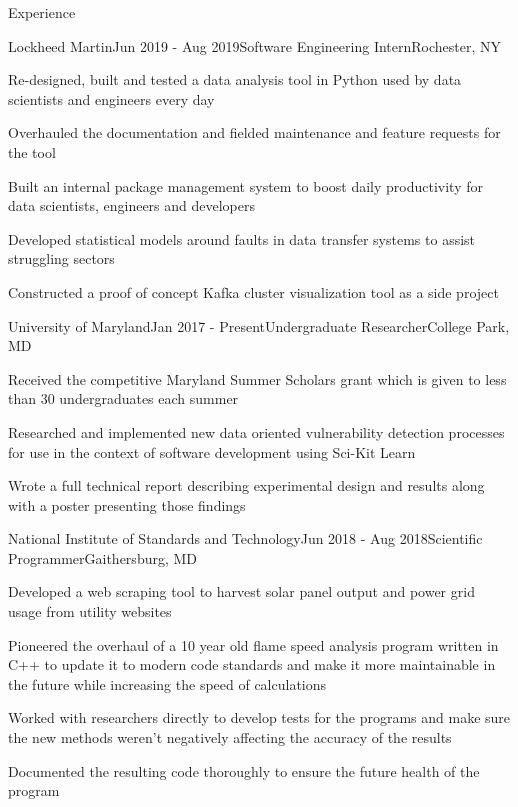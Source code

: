 \documentclass{resume} %
\begin{document}
\begin{rSection}{Experience}


\begin{rSubsection}{Lockheed Martin}{Jun 2019 - Aug 2019}{Software Engineering Intern}{Rochester, NY}
\item Re-designed, built and tested a data analysis tool in Python used by data scientists and engineers every day
\item Overhauled the documentation and fielded maintenance and feature requests for the tool
\item Built an internal package management system to boost daily productivity for data scientists, engineers and developers
\item Developed statistical models around faults in data transfer systems to assist struggling sectors
\item Constructed a proof of concept Kafka cluster visualization tool as a side project
\end{rSubsection}


\begin{rSubsection}{University of Maryland}{Jan 2017 - Present}{Undergraduate Researcher}{College Park, MD}
\item Received the competitive Maryland Summer Scholars grant which is given to less than 30 undergraduates each summer
\item Researched and implemented new data oriented vulnerability detection processes for use in the context of software development using Sci-Kit Learn
\item Wrote a full technical report describing experimental design and results along with a poster presenting those findings
\end{rSubsection}


\begin{rSubsection}{National Institute of Standards and Technology}{Jun 2018 - Aug 2018}{Scientific Programmer}{Gaithersburg, MD}
\item Developed a web scraping tool to harvest solar panel output and power grid usage from utility websites
\item Pioneered the overhaul of a 10 year old flame speed analysis program written in C++ to update it to modern code standards and make it more maintainable in the future while increasing the speed of calculations
\item Worked with researchers directly to develop tests for the programs and make sure the new methods weren't negatively affecting the accuracy of the results
\item Documented the resulting code thoroughly to ensure the future health of the program
\end{rSubsection}


\end{rSection}
\end{document}

